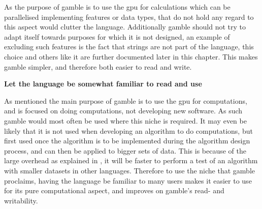As the purpose of \gls{gamble} is to use the \acrshort{gpu} for calculations which can be parallelised implementing features or data types, that do not hold any regard to this aspect would clutter the language.
Additionally \gls{gamble} should not try to adapt itself towards purposes for which it is not designed, an example of excluding such features is the fact that strings are not part of the language, this choice and others like it are further documented later in this chapter.
This makes \gls{gamble} simpler, and therefore both easier to read and write.

\textbf{Let the language be somewhat familiar to read and use}

As mentioned the main purpose of \gls{gamble} is to use the \acrshort{gpu} for computations, and is focused on doing computations, not developing new software.
As such \gls{gamble} would most often be used where this niche is required.
It may even be likely that it is not used when developing an algorithm to do computations, but first used once the algorithm is to be implemented during the algorithm design process, and can then be applied to bigger sets of data. \citep{AlgorithmDesign}
This is because of the large overhead as explained in , it will be faster to perform a test of an algorithm with smaller datasets in other languages.
Therefore to use the niche that \gls{gamble} proclaims, having the language be familiar to many users makes it easier to use for its pure computational aspect, and improves on \gls{gamble}'s read- and writability.
